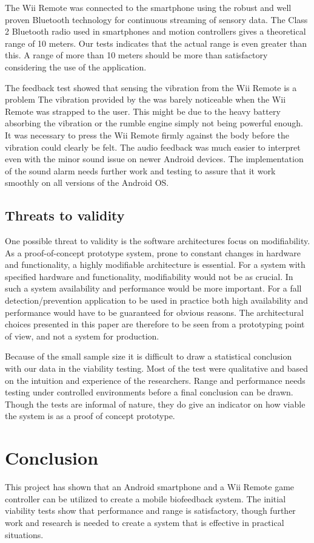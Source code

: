 The Wii Remote was connected to the smartphone using the robust and well proven Bluetooth technology for continuous streaming of sensory data. The Class 2 Bluetooth radio used in smartphones and motion controllers gives a theoretical range of 10 meters. Our tests indicates that the actual range is even greater than this. A range of more than 10 meters should be more than satisfactory considering the use of the application.

The feedback test showed that sensing the vibration from the Wii Remote is a problem
The vibration provided by the was barely noticeable when the Wii Remote was strapped to the user. This might be due to the heavy battery absorbing the vibration or the rumble engine simply not being powerful enough. It was necessary to press the Wii Remote firmly against the body before the vibration could clearly be felt. The audio feedback was much easier to interpret even with the minor sound issue on newer Android devices. The implementation of the sound alarm needs further work and testing to assure that it work smoothly on all versions of the Android OS.

\subsection{Threats to validity}
One possible threat to validity is the software architectures focus on modifiability. As a proof-of-concept prototype system, prone to constant changes in hardware and functionality, a highly modifiable architecture is essential. For a system with specified hardware and functionality, modifiability would not be as crucial. In such a system availability and performance would be more important. For a fall detection/prevention application to be used in practice both high availability and performance would have to be guaranteed for obvious reasons. The architectural choices presented in this paper are therefore to be seen from a prototyping point of view, and not a system for production.

Because of the small sample size it is difficult to draw a statistical conclusion with our data in the viability testing. Most of the test were qualitative and based on the intuition and experience of the researchers. Range and performance needs testing under controlled environments before a final conclusion can be drawn. Though the tests are informal of nature, they do give an indicator on how viable the system is as a proof of concept prototype. 

\section{Conclusion}
This project has shown that an Android smartphone and a Wii Remote game controller can be utilized to create a mobile biofeedback system. The initial viability tests show that performance and range is satisfactory, though further work and research is needed to create a system that is effective in practical situations.

